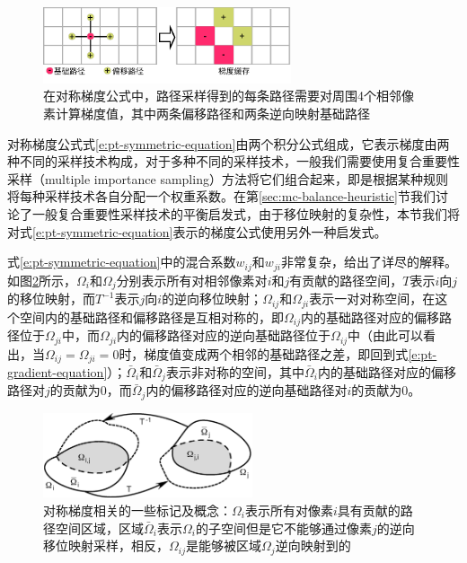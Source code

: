 \begin{figure}
	\sidecaption
	\includegraphics[width=0.65\textwidth]{figures/pt/four-neighbors}
	\caption{在对称梯度公式中，路径采样得到的每条路径需要对周围4个相邻像素计算梯度值，其中两条偏移路径和两条逆向映射基础路径}
	\label{f:pt-four-neighbors}
\end{figure}

对称梯度公式式\ref{e:pt-symmetric-equation}由两个积分公式组成，它表示梯度由两种不同的采样技术构成，对于多种不同的采样技术，一般我们需要使用复合重要性采样（multiple importance sampling）方法将它们组合起来，即是根据某种规则将每种采样技术各自分配一个权重系数。在第\ref{sec:mc-balance-heuristic}节我们讨论了一般复合重要性采样技术的平衡启发式，由于移位映射的复杂性，本节我们将对式\ref{e:pt-symmetric-equation}表示的梯度公式使用另外一种启发式。

式\ref{e:pt-symmetric-equation}中的混合系数$w_{ij}$和$w_{ji}$非常复杂，\cite{a:ImprovedSamplingforGradientDomainMetropolisLightTransport}给出了详尽的解释。如图\ref{f:pt-symmetric-gradient}所示，$\Omega_i$和$\Omega_j$分别表示所有对相邻像素对$i$和$j$有贡献的路径空间，$T$表示$i$向$j$的移位映射，而$T^{-1}$表示$j$向$i$的逆向移位映射；$\Omega_{ij}$和$\Omega_{ji}$表示一对对称空间，在这个空间内的基础路径和偏移路径是互相对称的，即$\Omega_{ij}$内的基础路径对应的偏移路径位于$\Omega_{ji}$中，而$\Omega_{ji}$内的偏移路径对应的逆向基础路径位于$\Omega_{ij}$中（由此可以看出，当$\Omega_{ij}=\Omega_{ji}=0$时，梯度值变成两个相邻的基础路径之差，即回到式\ref{e:pt-gradient-equation}）；$\bar{\Omega}_i$和$\bar{\Omega}_j$表示非对称的空间，其中$\bar{\Omega}_i$内的基础路径对应的偏移路径对$j$的贡献为0，而$\bar{\Omega}_j$内的偏移路径对应的逆向基础路径对$i$的贡献为0。

\begin{figure}
	\sidecaption
	\includegraphics[width=0.55\textwidth]{figures/pt/symmetric-gradient}
	\caption{对称梯度相关的一些标记及概念：$\Omega_i$表示所有对像素$i$具有贡献的路径空间区域，区域$\bar{\Omega}_i$表示$\Omega_i$的子空间但是它不能够通过像素$j$的逆向移位映射采样，相反，$\Omega_{ij}$是能够被区域$\Omega_j$逆向映射到的}
	\label{f:pt-symmetric-gradient}
\end{figure}

